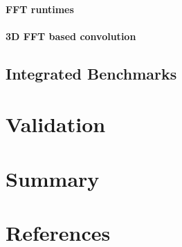 \documentclass [12pt]{article}
\begin{document}
\paragraph{FFT runtimes}

\paragraph{3D FFT based convolution}

\subsection{Integrated Benchmarks}
\section{Validation}
\section{Summary}
\section{References}
\end{document}
